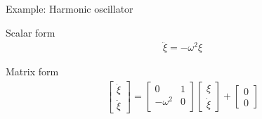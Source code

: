 \documentclass{beamer}
\begin{document}
\begin{frame}{Example: Harmonic oscillator}
  \centering
  \resizebox{!}{.4\textwidth}{}
  \begin{minipage}{.49\textwidth}
    \begin{block}{Scalar form}
    \begin{align*}
      \ddot{\xi} = -\omega^2\xi
    \end{align*}
    \vspace{.05cm}
    \end{block}
  \end{minipage}
  \begin{minipage}{.49\textwidth}
    \begin{block}{Matrix form}
      \begin{align*}
        \begin{bmatrix}
          \dot{\xi} \\ \ddot{\xi}
        \end{bmatrix}
        =
        \begin{bmatrix}
          0 & 1\\
          -\omega^2 & 0\\
        \end{bmatrix}
        \begin{bmatrix}
          \xi \\ \dot{\xi}
        \end{bmatrix}
        +
        \begin{bmatrix}
          0 \\ 0
        \end{bmatrix}
      \end{align*}
    \end{block}
  \end{minipage}
\end{frame}
\end{document}
